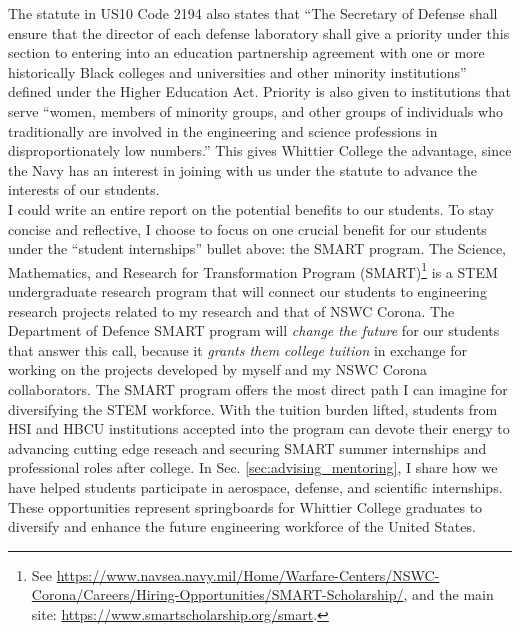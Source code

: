 \documentclass[../../../main.tex]{subfiles}
\begin{document}
The statute in US10 Code 2194 also states that ``The Secretary of Defense shall ensure that the director of each defense laboratory shall give a priority under this section to entering into an education partnership agreement with one or more historically Black colleges and universities and other minority institutions'' defined under the Higher Education Act.  Priority is also given to institutions that serve ``women, members of minority groups, and other groups of individuals who traditionally are involved in the engineering and science professions in disproportionately low numbers.''  This gives Whittier College the advantage, since the Navy has an interest in joining with us under the statute to advance the interests of our students.
\\
\vspace{0.25cm}
I could write an entire report on the potential benefits to our students.  To stay concise and reflective, I choose to focus on one crucial benefit for our students under the ``student internships'' bullet above: the SMART program.  The Science, Mathematics, and Research for Transformation Program (SMART)\footnote{See \url{https://www.navsea.navy.mil/Home/Warfare-Centers/NSWC-Corona/Careers/Hiring-Opportunities/SMART-Scholarship/}, and the main site: \url{https://www.smartscholarship.org/smart}.} is a STEM undergraduate research program that will connect our students to engineering research projects related to my research and that of NSWC Corona.  The Department of Defence SMART program will \textit{change the future} for our students that answer this call, because it \textit{grants them college tuition} in exchange for working on the projects developed by myself and my NSWC Corona collaborators.  The SMART program offers the most direct path I can imagine for diversifying the STEM workforce.  With the tuition burden lifted, students from HSI and HBCU institutions accepted into the program can devote their energy to advancing cutting edge reseach and securing SMART summer internships and professional roles after college.  In Sec. \ref{sec:advising_mentoring}, I share how we have helped students participate in aerospace, defense, and scientific internships.  These opportunities represent springboards for Whittier College graduates to diversify and enhance the future engineering workforce of the United States.
\end{document}
